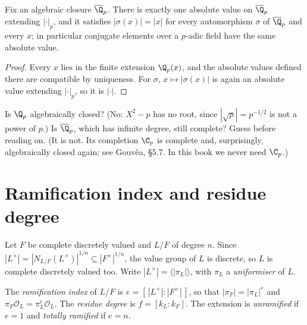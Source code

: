 \begin{corollary}\label{cor:galoisinv}
Fix an algebraic closure $\overline{\Q}_p$. There is exactly one absolute value on $\overline{\Q}_p$ extending $|\cdot|_p$,
and it satisfies $|\sigma(x)|=|x|$ for every automorphism $\sigma$ of $\overline{\Q}_p$ and every $x$; in particular conjugate
elements over a $p$-adic field have the same absolute value.
\end{corollary}
\begin{proof}
Every $x$ lies in the finite extension $\Q_p(x)$, and the absolute values defined there are compatible by uniqueness. For
$\sigma$, $x\mapsto|\sigma(x)|$ is again an absolute value extending $|\cdot|_p$, so it is $|\cdot|$.
\end{proof}

\begin{think}
Is $\Q_p$ algebraically closed? (No: $X^2-p$ has no root, since $|\sqrt p|=p^{-1/2}$ is not a power of $p$.) Is
$\overline{\Q}_p$, which has infinite degree, still complete? Guess before reading on. (It is not. Its completion $\C_p$ is
complete and, surprisingly, algebraically closed again; see Gouv\^ea, \S5.7. In this book we never need $\C_p$.)
\end{think}

\section{Ramification index and residue degree}

Let $F$ be complete discretely valued and $L/F$ of degree $n$. Since $|L^\times|=|N_{L/F}(L^\times)|^{1/n}\subseteq
|F^\times|^{1/n}$, the value group of $L$ is discrete, so $L$ is complete discretely valued too. Write
$|L^\times|=\langle|\pi_L|\rangle$, with $\pi_L$ a \emph{uniformiser} of $L$.

\begin{definition}
The \emph{ramification index} of $L/F$ is $e=[\,|L^\times|:|F^\times|\,]$, so that $|\pi_F|=|\pi_L|^e$ and $\pi_F\mathcal O_L=
\pi_L^e\mathcal O_L$. The \emph{residue degree} is $f=[k_L:k_F]$. The extension is \emph{unramified} if $e=1$ and
\emph{totally ramified} if $e=n$.
\end{definition}

